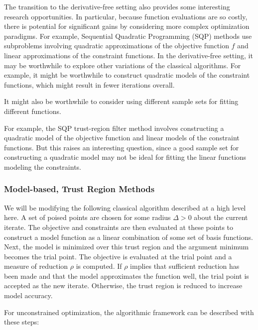 \documentclass{article}
\begin{document}
The transition to the derivative-free setting also provides some interesting research opportunities.
In particular, because function evaluations are so costly, there is potential for significant gains by considering more complex optimization paradigms.
For example, Sequential Quadratic Programming (SQP) methods use subproblems involving quadratic approximations of the objective function $f$ and linear approximations of the constraint functions.
In the derivative-free setting, it may be worthwhile to explore other variations of the classical algorithms.
For example, it might be worthwhile to construct quadratic models of the constraint functions, which might result in fewer iterations overall.

It might also be worthwhile to consider using different sample sets for fitting different functions.  

For example, the SQP trust-region filter method involves constructing a quadratic model of the objective function and linear models of the constraint functions.  But this raises an interesting question, since a good sample set for constructing a quadratic model may not be ideal for fitting the linear functions modeling the constraints.  


\subsubsection{Model-based, Trust Region Methods}
We will be modifying the following classical algorithm described at a high level here.
A set of poised points are chosen for some radius $\Delta>0$ about the current iterate.
The objective and constraints are then evaluated at these points to construct a model function as a linear combination of some set of basis functions.
Next, the model is minimized over this trust region and the argument minimum becomes the trial point.
The objective is evaluated at the trial point and a measure of reduction $\rho$ is computed.
If $\rho$ implies that sufficient reduction has been made and that the model approximates the function well, the trial point is accepted as the new iterate.
Otherwise, the trust region is reduced to increase model accuracy.


For unconstrained optimization, the algorithmic framework can be described with these steps:
\end{document}
